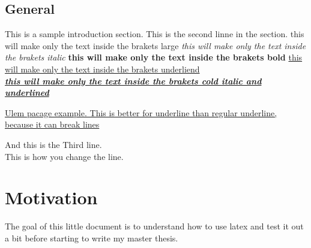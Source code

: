 \documentclass[16pt,a4paper]{article}
\begin{document}
\subsection{General} \label{sec:Mysec}
This is a sample introduction section.
This is the second linne in the section.
{\Large this will make only the text inside the brakets large}
\textit{ this will make only the text inside the brakets italic}
\textbf{ this will make only the text inside the brakets bold}
\underline{this will make only the text inside the brakets underliend} \\
\textbf{\textit{\underline{ this will make only the text inside the brakets cold italic and underlined }}}

\uline{Ulem pacage example. This is better for underline than regular underline, because it can break lines}





And this is the Third line. \\
This is how you change the line.

\section{Motivation}
The goal of this little document is to understand how to use latex and test it out a bit before starting to write my master thesis.

\pagebreak
\end{document}
